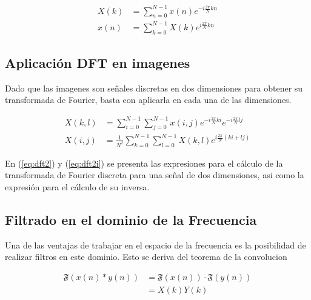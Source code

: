 \documentclass[
  letterpaper,
  twocolumn,
  9pt,
  journal,
  final]{IEEEtran}
\begin{document}
\begin{align}
	X(k) &= \sum_{n=0}^{N-1} x(n) e ^{-i \frac{2\pi}{N} k n } \label{eq:dft} \\
	x(n) &= \sum_{k=0}^{N-1} X(k) e ^{ i \frac{2\pi}{N} k n } \label{eq:dfti}
\end{align}

\subsection{Aplicación DFT en imagenes}

Dado que las imagenes son señales discretas en dos dimensiones para obtener su transformada de Fourier, basta con aplicarla en cada una de las dimensiones.

\begin{align}
	X(k,l) &= \sum_{i=0}^{N-1} \sum_{j=0}^{N-1} x(i,j) e ^ {-i \frac{2\pi}{N} k i} e ^ {-i \frac{2\pi}{N} l j} \label{eq:dft2} \\
	X(i,j) &= \frac{1}{N^2} \sum_{k=0}^{N-1} \sum_{l=0}^{N-1} X(k,l) e ^ {i \frac{2\pi}{N} (ki +lj)} \label{eq:dft2i}
\end{align}

En (\ref{eq:dft2}) y (\ref{eq:dft2i}) se presenta las expresiones para el cálculo de la transformada de Fourier discreta para una señal de dos dimensiones, asi como la expresión para el cálculo de su inversa.

\subsection{Filtrado en el dominio de la Frecuencia}

Una de las ventajas de trabajar en el espacio de la frecuencia es la posibilidad de realizar filtros en este dominio. Esto se deriva del teorema de la convolucion

\begin{align}
	\mathfrak{F} (x(n) * y(n) ) &= \mathfrak{F}(x(n)) \cdot \mathfrak{F}(y(n))\\
	&= X(k) Y(k)
\end{align}


\nocite{*}


\end{document}
